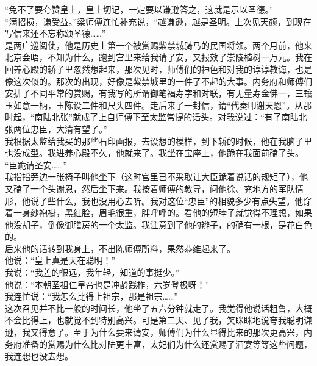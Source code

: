 “免不了要夸赞皇上，皇上切记，一定要以谦逊答之，这就是示以圣德。”\\

“满招损，谦受益。”梁师傅连忙补充说，“越谦逊，越是圣明。上次见天颜，到现在写信来还不忘称颂圣德……”\\

是两广巡阅使，他是历史上第一个被赏赐紫禁城骑马的民国将领。两个月前，他来北京会晤，不知为什么，跑到宫里来给我请了安，又报效了崇陵植树一万元。我在回养心殿的轿子里忽然想起来，那次见时，师傅们的神色和对我的谆谆教诲，也是像这次似的。那次的出现，好像是紫禁城里的一件了不起的大事。内务府和师傅们安排了不同平常的赏赐，有我写的所谓御笔福寿字和对联，有无量寿金佛一，三镶玉如意一柄，玉陈设二件和尺头四件。走后来了一封信，请“代奏叩谢天恩”。从那时起，“南陆北张”就成了上自师傅下至太监常提的话头。对我说过：“有了南陆北张两位忠臣，大清有望了。”\\

我根据太监给我买的那些石印画报，去设想的模样，到下轿的时候，他在我脑子里也没成型。我进养心殿不久，他就来了。我坐在宝座上，他跪在我面前磕了头。\\

“臣跪请圣安……”\\

我指指旁边一张椅子叫他坐下（这时宫里已不采取让大臣跪着说话的规矩了），他又磕了一个头谢恩，然后坐下来。我按着师傅的教导，问他徐、兖地方的军队情形，他说了些什么，我也没用心去听。我对这位“忠臣”的相貌多少有点失望。他穿着一身纱袍褂，黑红脸，眉毛很重，胖呼呼的。看他的短脖子就觉得不理想，如果他没胡子，倒像御膳房的一个太监。我注意到了他的辫子，的确有一根，是花白色的。\\

后来他的话转到我身上，不出陈师傅所料，果然恭维起来了。\\

他说：“皇上真是天在聪明！”\\

我说：“我差的很远，我年轻，知道的事挺少。”\\

他说：“本朝圣祖仁皇帝也是冲龄践柞，六岁登极呀！”\\

我连忙说：“我怎么比得上祖宗，那是祖宗……”\\

这次召见并不比一般的时间长，他坐了五六分钟就走了。我觉得他说话粗鲁，大概不会比得上，也就觉不到特别高兴。可是第二天、见了我，笑眯眯地说夸我聪明谦逊，我又得意了。至于为什么要来请安，师傅们为什么显得比来的那次更高兴，内务府准备的赏赐为什么比对陆更丰富，太妃们为什么还赏赐了酒宴等等这些问题，我连想也没去想。\\

